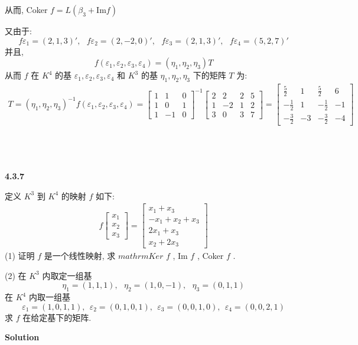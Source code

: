 \documentclass[11pt,a4paper,openany,oneside]{book}
\newcommand\Solution{\noindent\textbf{\textsf{Solution}}\par\medskip}
\begin{document}
从而, Coker $ f = L(\beta_3 +  \mathrm{Im} f)  $ 

又由于:
 $$  f\varepsilon_1 = (2, 1, 3)', \ \ \ f\varepsilon_2=(2, -2, 0)', \ \ \ f\varepsilon_3=(2,1,3)', \ \ \ f\varepsilon_4=(5,2,7)'  $$ 
并且, 
 $$  f(\varepsilon_1, \varepsilon_2, \varepsilon_3, \varepsilon_4)= (\eta_1, \eta_2, \eta_3)T  $$  
从而 $ f $ 在 $ K^4 $ 的基 $ \varepsilon_1, \varepsilon_2, \varepsilon_3, \varepsilon_4 $ 和 $ K^3 $ 的基 $ \eta_1, \eta_2, \eta_3 $ 下的矩阵 $ T $ 为:
\begin{gather*}
T =(\eta_1, \eta_2, \eta_3)^{-1}f(\varepsilon_1, \varepsilon_2, \varepsilon_3, \varepsilon_4) =
\begin{bmatrix}
1  &  1  &  0  \\
1  &  0  &  1 \\
1  &  -1  &  0
\end{bmatrix}^{-1}
\begin{bmatrix}
2  &  2  &  2  & 5 \\
1  &  -2  &  1 &  2 \\
3  &  0  &  3  &  7
\end{bmatrix}
= 
\begin{bmatrix}
\frac{5}{2}  &   1   &   \frac{5}{2}   &  6 \\
-\frac{1}{2} &   1   &   -\frac{1}{2}  &  -1 \\
-\frac{3}{2} &  -3   &  -\frac{3}{2}   &  -4
\end{bmatrix}
\end{gather*}  \\  \\  \\




\begin{myexample}
	\textbf{4.3.7}

定义 $ K^3 $ 到 $ K^4 $ 的映射 $ f $ 如下:
\begin{gather*}
f
\begin{bmatrix}
x_1 \\ x_2 \\ x_3
\end{bmatrix}
=
\begin{bmatrix}
x_1+x_3 \\
-x_1 + x_2 + x_3 \\
2x_1 + x_3 \\
x_2 + 2x_3
\end{bmatrix}
\end{gather*}
(1) 证明 $ f $ 是一个线性映射, 求 $mathrm{Ker}$  $ f $ , Im $ f $ , Coker $ f $ .

(2) 在 $ K^3 $ 内取定一组基
 $$  \eta_1 = (1,1,1),  \ \ \ \eta_2=(1,0,-1), \ \ \ \eta_3=(0,1,1)  $$ 
在 $ K^4 $ 内取一组基
 $$  \varepsilon_1=(1,0,1,1), \ \ \varepsilon_2=(0,1,0,1), \ \ \varepsilon_3=(0,0,1,0), \ \ \varepsilon_4=(0,0,2,1)  $$ 
求 $ f $ 在给定基下的矩阵.  \\

\end{myexample}
\Solution  
\end{document}
